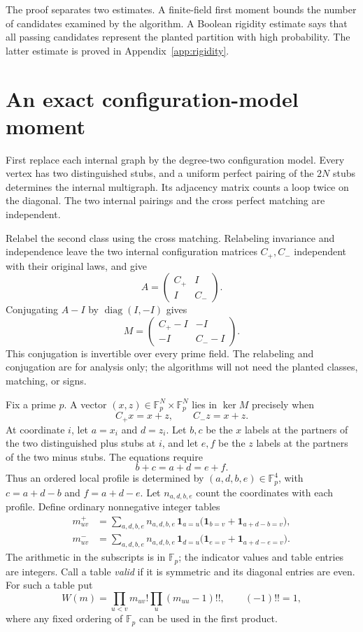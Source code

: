\documentclass[11pt]{article}
\theoremstyle{remark}
\newcommand{\F}{\mathbb F}
\newcommand{\1}{\mathbf 1}
\DeclareMathOperator{\diag}{diag}
\begin{document}
The proof separates two estimates. A finite-field first moment bounds
the number of candidates examined by the algorithm. A Boolean rigidity
estimate says that all passing candidates represent the planted
partition with high probability. The latter estimate is proved in
Appendix~\ref{app:rigidity}.

\section{An exact configuration-model moment}

First replace each internal graph by the degree-two configuration
model. Every vertex has two distinguished stubs, and a uniform perfect
pairing of the $2N$ stubs determines the internal multigraph.
Its adjacency matrix counts a loop twice on the diagonal. The two
internal pairings and the cross perfect matching are independent.

Relabel the second class using the cross matching. Relabeling
invariance and independence leave the two internal configuration
matrices $C_+,C_-$ independent with their original laws, and give
\[
 A=\begin{pmatrix}C_+&I\\I&C_-\end{pmatrix}.
\]
Conjugating $A-I$ by $\diag(I,-I)$ gives
\begin{equation}\label{eq:M}
 M=\begin{pmatrix}C_+-I&-I\\-I&C_--I\end{pmatrix}.
\end{equation}
This conjugation is invertible over every prime field. The relabeling
and conjugation are for analysis only; the algorithms will not need
the planted classes, matching, or signs.

Fix a prime $p$. A vector $(x,z)\in\F_p^N\times\F_p^N$ lies in
$\ker M$ precisely when
\begin{equation}\label{eq:local-equations}
 C_+x=x+z,\qquad C_-z=x+z.
\end{equation}
At coordinate $i$, let $a=x_i$ and $d=z_i$. Let $b,c$ be the $x$
labels at the partners of the two distinguished plus stubs at $i$,
and let $e,f$ be the $z$ labels at the partners of the two minus
stubs. The equations require
\[
 b+c=a+d=e+f.
\]
Thus an ordered local profile is determined by
$(a,d,b,e)\in\F_p^4$, with $c=a+d-b$ and $f=a+d-e$.
Let $n_{a,d,b,e}$ count the coordinates with each profile. Define
ordinary nonnegative integer tables
\begin{align*}
 m^+_{uv}
 &=\sum_{a,d,b,e}n_{a,d,b,e}\,
       \boldsymbol{1}_{a=u}
       \bigl(\boldsymbol{1}_{b=v}+\boldsymbol{1}_{a+d-b=v}\bigr),\\
 m^-_{uv}
 &=\sum_{a,d,b,e}n_{a,d,b,e}\,
       \boldsymbol{1}_{d=u}
       \bigl(\boldsymbol{1}_{e=v}+\boldsymbol{1}_{a+d-e=v}\bigr).
\end{align*}
The arithmetic in the subscripts is in $\F_p$; the indicator values
and table entries are integers. Call a table \emph{valid} if it is
symmetric and its diagonal entries are even. For such a table put
\[
 W(m)=\prod_{u<v}m_{uv}!\prod_u(m_{uu}-1)!!,
 \qquad (-1)!!=1,
\]
where any fixed ordering of $\F_p$ can be used in the first product.
\end{document}
